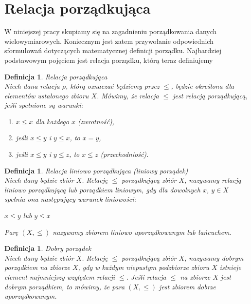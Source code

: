 \documentclass[12pt,a4paper]{report}
\newtheorem{definition}[theorem]{Definicja}
\begin{document}
\newpage
\section{Relacja porządkująca}
W niniejszej pracy skupiamy się na zagadnieniu porządkowania danych wielowymiarowych. Koniecznym jest zatem przywołanie odpowiednich sformułowań dotyczących matematycznej definicji porządku. Najbardziej podstawowym pojęciem jest relacja porządku, którą teraz definiujemy\\

\begin{definition}{Relacja porządkująca \cite[Rozdział 1]{kuratowski2004}\\}
Niech dana relacja $\rho$, którą oznaczać będziemy przez $\leq$, będzie określona dla elementów ustalonego zbioru $X$. Mówimy, że relacja $\leq$ jest relacją porządkującą, jeśli spełnione są warunki:
\begin{enumerate}
\item $x \leq x$ dla każdego $x$ (zwrotność),
\item jeśli $x \leq y$ i $y \leq x$, to $x=y$,
\item jeśli $x \leq y$ i $y \leq z$, to $x \leq z$ (przechodniość).\\
\end{enumerate}
\end{definition}

\begin{definition}{Relacja liniowo porządkująca (liniowy porządek) \cite[Rozdział 2]{blaszczyk2007}\\}
Niech dany będzie zbiór $X$. Relację $\leq$ porządkującą zbiór $X$, nazywamy relacją liniowo porządkującą lub porządkiem liniowym, gdy dla dowolnych $x$, $y \in X$ spełnia ona następujący warunek liniowości:
\begin{center}
$x \leq y$ lub $y \leq x$
\end{center}
Parę $(X, \leq)$ nazywamy zbiorem liniowo uporządkowanym lub łańcuchem.\\
\end{definition}

\begin{definition}{Dobry porządek \cite[Rozdział 2]{blaszczyk2007}\\}
Niech dany będzie zbiór $X$. Relację $\leq$ porządkującą zbiór $X$, nazywamy dobrym porządkiem na zbiorze $X$, gdy w każdym niepustym podzbiorze zbioru $X$ istnieje element najmniejszy względem relacji $\leq$. Jeśli relacja $\leq$ na zbiorze $X$ jest dobrym porządkiem, to mówimy, że para $(X,\leq)$ jest zbiorem dobrze uporządkowanym.\\
\end{definition}
\end{document}
